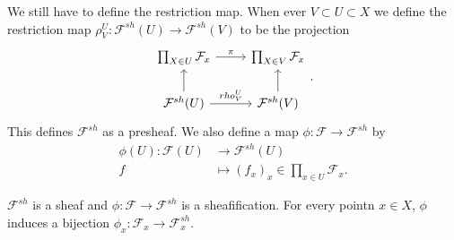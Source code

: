 We still have to define the restriction map. When ever $V \subset U \subset X$ we define the restriction map $\rho_V^{U}:\mathcal{F} ^{sh}(U) \to \mathcal{F} ^{sh}(V)$ to be the projection \[
\begin{tikzcd}
	\prod_{X \in U} \mathcal{F} _x \arrow[r, "\pi"] & \prod_{X \in V} \mathcal{F} _x \\
	\mathcal{F} ^{sh}(U) \arrow[u] \arrow[r, "rho_V^{U}"] & \mathcal{F} ^{sh}(V) \arrow[u]
\end{tikzcd}
.\] 
This defines $\mathcal{F} ^{sh}$ as a presheaf. 
We also define a map $\phi: \mathcal{F}  \to \mathcal{F} ^{sh}$ by 
\begin{align*}
	\phi(U): \mathcal{F} (U) &\longrightarrow \mathcal{F} ^{sh}(U) \\
	f  &\longmapsto (f_x)_x \in \prod_{x \in U} \mathcal{F}_x
.\end{align*}

\begin{exercise}
	$\mathcal{F} ^{sh}$ is a sheaf and $\phi:\mathcal{F}  \to \mathcal{F} ^{sh}$ is a sheafification.
	For every pointn $x \in X$, $\phi$ induces a bijection $\phi_x: \mathcal{F} _x \to \mathcal{F} ^{sh}_x$.	
\end{exercise}


